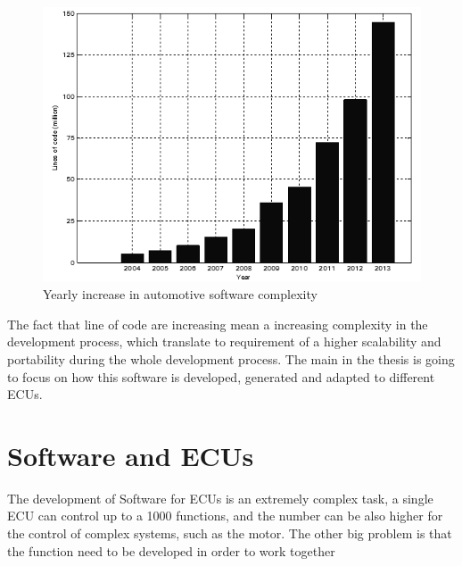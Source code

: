 \documentclass[../main.tex]{subfiles}
\begin{document}
\begin{figure}[H]
    \centering
    \includegraphics[width=0.6\linewidth]{images_folder/Yearly-increase-in-automotive-software-complexity-shown-by-million-lines-of-code-of-1-ConvertImage.png}
    \caption{Yearly increase in automotive software complexity}
    \label{fig:yearlyincreas}
\end{figure}
The fact that line of code are increasing mean a increasing complexity in the development process, which translate to requirement of a higher scalability and portability during the whole development process. The main in the thesis is going to focus on how this software is developed, generated and adapted to different ECUs. 
\section{Software and ECUs}
The development of Software for ECUs is an extremely complex task, a single ECU can control up to a 1000 functions, and the number can be also higher for the control of complex systems, such as the motor. The other big problem is that the function need to be developed in order to work together 
\cleardoublepage
\end{document}
